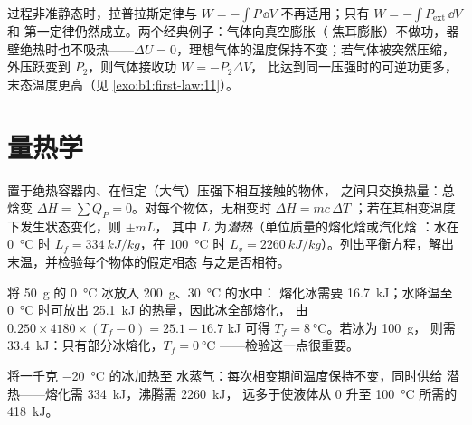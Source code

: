 \begin{remark}[不可逆过程]\label{rem:b1:first-law:irreversible}
过程非准静态时，拉普拉斯定律与 $W =
-\int P\,\dd V$ 不再适用；只有 $W = -\int P_{\mathrm{ext}}\,\dd V$ 和
第一定律仍然成立。两个经典例子：气体向真空膨胀（
焦耳膨胀）不做功，器壁绝热时也不吸热——$\Delta U
= 0$，理想气体的温度保持不变；若气体被突然压缩，
外压跃变到 $P_2$，则气体接收功 $W = -P_2\Delta V$，
比达到同一压强时的可逆功更多，末态温度更高（见
\cref{exo:b1:first-law:11}）。
\end{remark}

\section{量热学}

\begin{method}[量热平衡]\label{met:b1:first-law:calorimetry}
置于绝热容器内、在恒定（大气）压强下相互接触的物体，
之间只交换热量：总焓变
$\Delta H = \sum Q_P = 0$。对每个物体，无相变时 $\Delta H = mc\,\Delta T$
；若在其相变温度下发生状态变化，则 $\pm mL$，
其中 $L$ 为\emph{潜热}（单位质量的熔化焓或汽化焓
：水在 \qty{0}{\degreeCelsius} 时 $L_f = \qty{334}{kJ/kg}$，在 \qty{100}{\degreeCelsius} 时 $L_v =
\qty{2260}{kJ/kg}$）。列出平衡方程，解出
末温，并检验每个物体的假定相态
与之是否相符。
\end{method}

\begin{example}[冰入水中]\label{ex:b1:first-law:ice}
将 \qty{50}{g} 的 \qty{0}{\degreeCelsius} 冰放入 \qty{200}{g}、\qty{30}{\degreeCelsius} 的水中：
熔化冰需要 \qty{16.7}{kJ}；水降温至 \qty{0}{\degreeCelsius} 时可放出
\qty{25.1}{kJ} 的热量，因此冰全部熔化，
由 $0.250 \times 4180 \times (T_f - 0) = 25.1 - 16.7$ kJ 可得
$T_f = \qty{8}{\degreeCelsius}$。若冰为 \qty{100}{g}，
则需 \qty{33.4}{kJ}：只有部分冰熔化，$T_f = \qty{0}{\degreeCelsius}$
——检验这一点很重要。
\end{example}

\begin{omfigure}

{\small 将一千克 \qty{-20}{\degreeCelsius} 的冰加热至
水蒸气：每次相变期间温度保持不变，同时供给
潜热——熔化需 \qty{334}{kJ}，沸腾需 \qty{2260}{kJ}，
远多于使液体从 \qty{0}{} 升至
\qty{100}{\degreeCelsius} 所需的 \qty{418}{kJ}。}
\end{omfigure}

